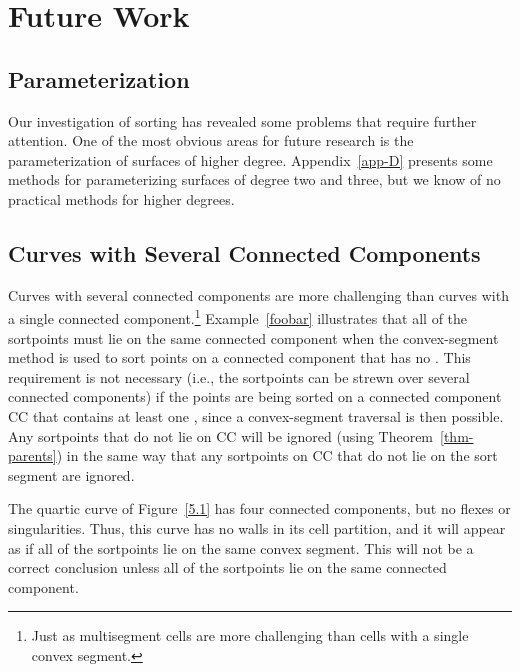 \section{Future Work}
\subsection{Parameterization}

Our investigation of sorting has revealed some problems that require
further attention.
One of the most obvious areas for future 
research is the parameterization of surfaces of higher degree.
Appendix~\ref{app-D} presents 
some methods for parameterizing surfaces of 
degree two and three, but we know of no practical methods for higher degrees.
%
\subsection{Curves with Several Connected Components}
\label{manycomponents}

Curves with several connected components are more challenging
than curves with a single connected component.\footnote{Just as 
multisegment cells are more challenging than cells with a single convex
segment.}
Example~\ref{foobar} illustrates that all of the sortpoints must lie on the
same connected component when the convex-segment method is used to sort points
on a connected component that has no \wallpoints.
This requirement is not necessary (i.e., the sortpoints can be strewn over 
several connected components)
if the points are being sorted on a connected
component CC that contains at least one \wallpoint, since a convex-segment
traversal is then possible.
Any sortpoints that do not lie on CC will 
be ignored (using Theorem~\ref{thm-parents})
in the same way that
any sortpoints on CC that do not lie on the sort segment are ignored.
%
\begin{example}
\label{foobar}
The quartic curve of Figure~\ref{5.1} has four connected components, but 
no flexes or singularities.
Thus, this curve has no walls in its cell partition, and it will appear as if
all of the sortpoints lie on the same convex segment.
This will not be a correct 
conclusion unless all of the sortpoints lie on the same connected component.
\end{example}
%

